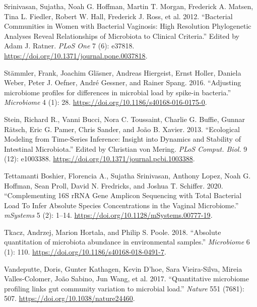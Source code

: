 \documentclass[
]{article}
\newlength{\cslhangindent}
\newlength{\cslentryspacingunit} %
\newenvironment{CSLReferences}[2] %
 {%
  \setlength{\parindent}{0pt}
  \ifodd #1
  \let\oldpar\par
  \def\par{\hangindent=\cslhangindent\oldpar}
  \fi
  \setlength{\parskip}{#2\cslentryspacingunit}
 }%
 {}
\begin{document}
\begin{CSLReferences}{1}{0}
\leavevmode{}%
Srinivasan, Sujatha, Noah G. Hoffman, Martin T. Morgan, Frederick A. Matsen, Tina L. Fiedler, Robert W. Hall, Frederick J. Ross, et al. 2012. {``{Bacterial Communities in Women with Bacterial Vaginosis: High Resolution Phylogenetic Analyses Reveal Relationships of Microbiota to Clinical Criteria}.''} Edited by Adam J. Ratner. \emph{PLoS One} 7 (6): e37818. \url{https://doi.org/10.1371/journal.pone.0037818}.

\leavevmode{}%
Stämmler, Frank, Joachim Gläsner, Andreas Hiergeist, Ernst Holler, Daniela Weber, Peter J. Oefner, André Gessner, and Rainer Spang. 2016. {``{Adjusting microbiome profiles for differences in microbial load by spike-in bacteria}.''} \emph{Microbiome} 4 (1): 28. \url{https://doi.org/10.1186/s40168-016-0175-0}.

\leavevmode{}%
Stein, Richard R., Vanni Bucci, Nora C. Toussaint, Charlie G. Buffie, Gunnar Rätsch, Eric G. Pamer, Chris Sander, and João B. Xavier. 2013. {``{Ecological Modeling from Time-Series Inference: Insight into Dynamics and Stability of Intestinal Microbiota}.''} Edited by Christian von Mering. \emph{PLoS Comput. Biol.} 9 (12): e1003388. \url{https://doi.org/10.1371/journal.pcbi.1003388}.

\leavevmode{}%
Tettamanti Boshier, Florencia A., Sujatha Srinivasan, Anthony Lopez, Noah G. Hoffman, Sean Proll, David N. Fredricks, and Joshua T. Schiffer. 2020. {``{Complementing 16S rRNA Gene Amplicon Sequencing with Total Bacterial Load To Infer Absolute Species Concentrations in the Vaginal Microbiome}.''} \emph{mSystems} 5 (2): 1--14. \url{https://doi.org/10.1128/mSystems.00777-19}.

\leavevmode{}%
Tkacz, Andrzej, Marion Hortala, and Philip S. Poole. 2018. {``{Absolute quantitation of microbiota abundance in environmental samples}.''} \emph{Microbiome} 6 (1): 110. \url{https://doi.org/10.1186/s40168-018-0491-7}.

\leavevmode{}%
Vandeputte, Doris, Gunter Kathagen, Kevin D'hoe, Sara Vieira-Silva, Mireia Valles-Colomer, João Sabino, Jun Wang, et al. 2017. {``{Quantitative microbiome profiling links gut community variation to microbial load}.''} \emph{Nature} 551 (7681): 507. \url{https://doi.org/10.1038/nature24460}.


\end{CSLReferences}
\end{document}
